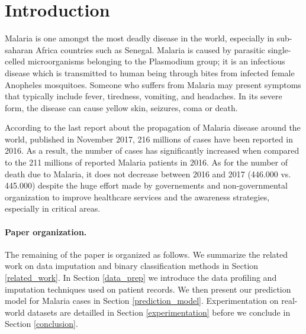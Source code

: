 \section{Introduction}\label{intro}

Malaria is one amongst the most deadly disease in the world, especially in sub-saharan Africa countries such as Senegal.
Malaria is caused by parasitic single-celled microorganisms belonging to the Plasmodium group; it is an infectious
disease which is transmitted to human being through bites from infected female Anopheles mosquitoes. Someone who suffers
from  Malaria may present symptoms that typically include fever, tiredness, vomiting, and headaches. In its severe form,
the disease can cause yellow skin, seizures, coma or death.

According to the last report about the propagation of Malaria disease around the world, published in November 2017, 216 millions of cases have been 
reported in 2016. As a result, the number of cases has significantly increased when compared to the 211 millions of reported Malaria patients in 2016.
As for the number of death due to Malaria, it does not decrease between 2016 and 2017 (446.000 vs. 445.000) despite the huge effort made by governements
and non-governmental organization to improve healthcare services and the awareness strategies, especially in critical areas. 
 













\paragraph*{Paper organization.}The remaining of the paper is organized as follows. We summarize the related work on data imputation and binary classification methods in Section \ref{related_work}.
In Section \ref{data_prep} we introduce the data profiling and imputation techniques used on patient records. We then present our prediction model for Malaria cases in Section \ref{prediction_model}.
Experimentation on real-world datasets are detailled in Section \ref{experimentation} before we conclude in Section \ref{conclusion}. 
